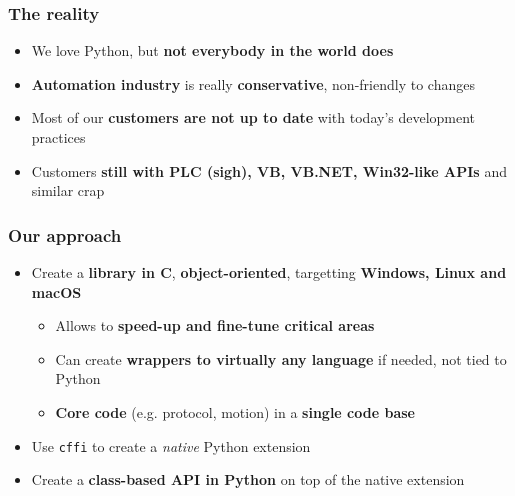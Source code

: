 \documentclass{beamer}
\begin{document}
\begin{frame}
  \frametitle{The reality}
  \begin{itemize}
    \item<1-> We love Python, but \textbf{not everybody in the world does}
    \item<2-> \textbf{Automation industry} is really \textbf{conservative},
      non-friendly to changes
    \item<3-> Most of our \textbf{customers are not up to date} with today's
      development practices
    \item<4-> Customers \textbf{still with PLC (sigh), VB, VB.NET, Win32-like
      APIs} and similar crap
  \end{itemize}
\end{frame}

\begin{frame}
  \frametitle{Our approach}

  \begin{itemize}
    \item<1-> Create a \textbf{library in C}, \textbf{object-oriented},
      targetting \textbf{Windows, Linux and macOS}
    \begin{itemize}
      \item<2-> Allows to \textbf{speed-up and fine-tune critical areas}
      \item<3-> Can create \textbf{wrappers to virtually any language} if
        needed, not tied to Python
      \item<4-> \textbf{Core code} (e.g. protocol, motion) in a \textbf{single
        code base}
    \end{itemize}
    \item<5-> Use \texttt{cffi} to create a \textit{native} Python extension
    \item<6-> Create a \textbf{class-based API in Python} on top of the native
      extension
  \end{itemize}

\end{frame}
\end{document}
